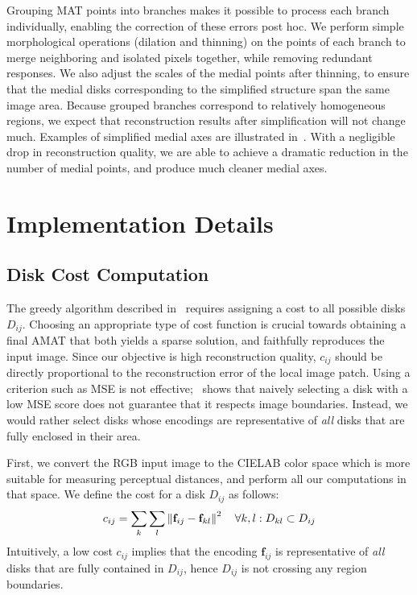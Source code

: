 \documentclass[10pt,twocolumn,letterpaper]{article}
\begin{document}
Grouping MAT points into branches makes it possible to process each branch individually, enabling
the correction of these errors post hoc.
We perform simple morphological operations (dilation and thinning) 
on the points of each branch to merge neighboring and isolated pixels together, while removing 
redundant responses. 
We also adjust the scales of the medial points after thinning, to ensure that the medial disks corresponding 
to the simplified structure span the same image area.
Because grouped branches correspond to relatively homogeneous regions, we expect that reconstruction
results after simplification will not change much.
Examples of simplified medial axes are illustrated in~.
With a negligible drop in reconstruction quality, we are able to achieve a dramatic reduction
in the number of medial points, and produce much cleaner medial axes.


\section{Implementation Details}\label{sec:implementation}
\subsection{Disk Cost Computation}\label{sec:implementation:diskcost}
The greedy algorithm described in~ requires assigning a cost to all possible disks $D_{ij}$.
Choosing an appropriate type of cost function is crucial towards obtaining a final AMAT that both 
yields a sparse solution, and faithfully reproduces the input image.
Since our objective is high reconstruction quality, $c_{ij}$ should be directly proportional
to the reconstruction error of the local image patch.
Using a criterion such as MSE is not effective;~ shows that naively selecting a disk with 
a low MSE score does not guarantee that it respects image boundaries.
Instead, we would rather select disks whose encodings are representative of \emph{all} disks that are fully enclosed
in their area. 

First, we convert the RGB input image to the CIELAB color space which is more suitable for measuring perceptual distances,
and perform all our computations in that space.
We define the cost for a disk $D_{ij}$ as follows:
\begin{equation}
c_{ij} = \sum_k \sum_l \left \lVert \mathbf{f}_{ij} - \mathbf{f}_{kl}  \right \rVert^2 \quad \forall k,l: D_{kl} \subset D_{ij}
\label{eq:diskcost}
\end{equation}
Intuitively, a low cost $c_{ij}$ implies that the encoding $\mathbf{f}_{ij}$ is representative of \emph{all}
disks that are fully contained in $D_{ij}$, hence $D_{ij}$ is not crossing any region boundaries.
\end{document}
